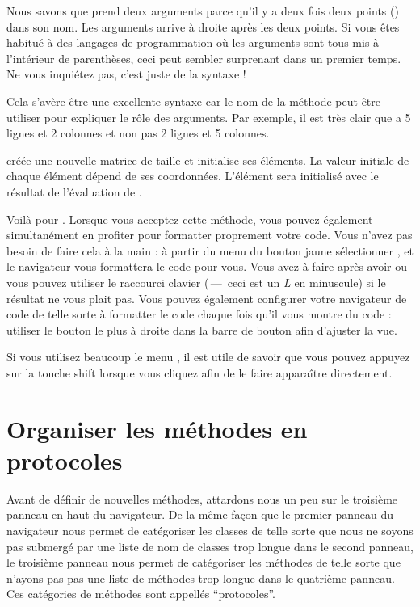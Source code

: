 \documentclass[a4paper,10pt,twoside]{book}
\begin{document}
Nous savons que  prend deux arguments parce qu'il y a deux fois deux points (\ct{:}) dans son nom. Les arguments arrive à droite après les deux points.
Si vous êtes habitué à des langages de programmation où les arguments sont tous mis à l'intérieur de parenthèses, ceci peut sembler surprenant dans un premier temps. Ne vous inquiétez pas, c'est juste de la syntaxe !

Cela s'avère être une excellente syntaxe car le nom de la méthode peut être utiliser pour expliquer le rôle des arguments. Par exemple, il est très clair que  a 5 lignes et 2 colonnes et non pas 2 lignes et 5 colonnes.

 créée une nouvelle matrice de taille  et initialise ses éléments. La valeur initiale de chaque élément dépend de ses coordonnées. L'élément  sera initialisé avec le résultat de l'évaluation de .  

Voilà pour .  Lorsque vous acceptez cette méthode, vous pouvez également simultanément en profiter pour formatter proprement votre code. Vous n'avez pas besoin de faire cela à la main : à partir du menu du bouton jaune sélectionner , et le navigateur vous formattera le code pour vous. Vous avez à faire  après avoir  ou vous pouvez utiliser le raccourci clavier  (\,---\, ceci est un \emph{L} en minuscule) si le résultat ne vous plait pas.
Vous pouvez également configurer votre navigateur de code de telle sorte à formatter le code chaque fois qu'il vous montre du code : utiliser le bouton le plus à droite dans la barre de bouton afin d'ajuster la vue.

Si vous utilisez beaucoup le menu , il est utile de savoir que vous pouvez appuyez sur la touche {\sc shift} lorsque vous cliquez afin de le faire apparaître directement.

\section{Organiser les méthodes en protocoles}

Avant de définir de nouvelles méthodes, attardons nous un peu sur le troisième panneau en haut du navigateur.
De la même façon que le premier panneau du navigateur nous permet de catégoriser les classes de telle sorte que nous ne soyons pas submergé par une liste de nom de classes trop longue dans le second panneau, le troisième panneau nous permet de catégoriser les méthodes de telle sorte que n'ayons pas pas une liste de méthodes trop longue dans le quatrième panneau.
Ces catégories de méthodes sont appellés ``protocoles''.
\end{document}
